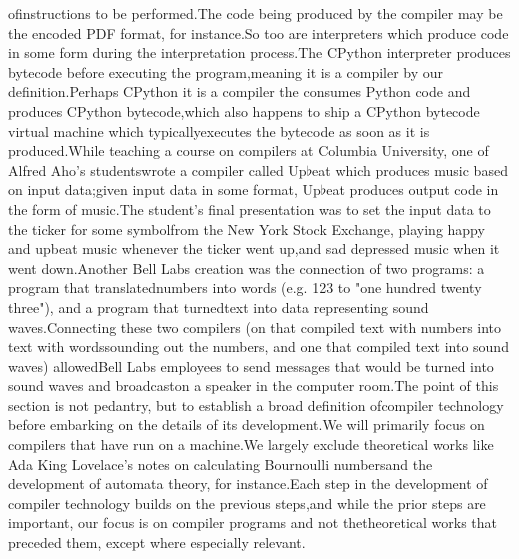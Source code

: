 ofinstructions to be performed.The code being produced by the compiler may be the encoded PDF format, for instance.So too are interpreters which produce code in some form during the interpretation process.The CPython interpreter produces bytecode before executing the program,meaning it is a compiler by our definition.Perhaps CPython it is a compiler the consumes Python code and produces CPython bytecode,which also happens to ship a CPython bytecode virtual machine which typicallyexecutes the bytecode as soon as it is produced.While teaching a course on compilers at Columbia University, one of Alfred Aho's studentswrote a compiler called Up$\flat$eat which produces music based on input data;given input data in some format, Up$\flat$eat produces output code in the form of music\cite{aho_oral_history_2022}.The student's final presentation was to set the input data to the ticker for some symbolfrom the New York Stock Exchange, playing happy and upbeat music whenever the ticker went up,and sad depressed music when it went down.Another Bell Labs creation was the connection of two programs: a program that translatednumbers into words (e.g. 123 to "one hundred twenty three"), and a program that turnedtext into data representing sound waves.Connecting these two compilers (on that compiled text with numbers into text with wordssounding out the numbers, and one that compiled text into sound waves) allowedBell Labs employees to send messages that would be turned into sound waves and broadcaston a speaker in the computer room.The point of this section is not pedantry, but to establish a broad definition ofcompiler technology before embarking on the details of its development.We will primarily focus on compilers that have run on a machine.We largely exclude theoretical works like Ada King Lovelace's notes on calculating Bournoulli numbersand the development of automata theory, for instance.Each step in the development of compiler technology builds on the previous steps,and while the prior steps are important, our focus is on compiler programs and not thetheoretical works that preceded them, except where especially relevant.
